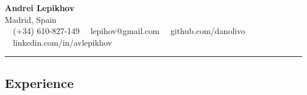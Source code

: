 \documentclass[11pt,letterpaper]{article}
\begin{document}
\begin{center}
	{\LARGE \textbf{Andrei Lepikhov}}\\
	Madrid, Spain
	\vspace{0.05cm}
	\\
	\raisebox{-0.2\height} {\Large \faPhoneSquare} \ \  (+34) 610-827-149 \hfill\raisebox{-0.2\height}{\Large \faEnvelopeSquare} \ \ lepihov@gmail.com \hfill \raisebox{-0.2\height}{\Large \faGithubSquare} \ \ github.com/danolivo \hfill \raisebox{-0.2\height}{\Large \faLinkedinSquare} \ \ linkedin.com/in/avlepikhov
\end{center}

\hrule
\vspace{-1em}
\subsection*{\Large Experience}
\end{document}
